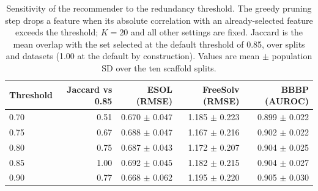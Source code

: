 \begin{table}[H]
\renewcommand{\thetable}{S20}
\centering
\small
\caption{Sensitivity of the recommender to the redundancy threshold. The greedy pruning step drops a feature when its absolute correlation with an already-selected feature exceeds the threshold; $K=20$ and all other settings are fixed. Jaccard is the mean overlap with the set selected at the default threshold of 0.85, over splits and datasets (1.00 at the default by construction). Values are mean $\pm$ population SD over the ten scaffold splits.}
\label{tab:redundancy}
\begin{tabular}{lrrrr}
\toprule
Threshold & Jaccard vs 0.85 & ESOL (RMSE) & FreeSolv (RMSE) & BBBP (AUROC) \\
\midrule
0.70 & 0.51 & 0.670 $\pm$ 0.047 & 1.185 $\pm$ 0.223 & 0.899 $\pm$ 0.022 \\
0.75 & 0.67 & 0.688 $\pm$ 0.047 & 1.167 $\pm$ 0.216 & 0.902 $\pm$ 0.022 \\
0.80 & 0.75 & 0.687 $\pm$ 0.043 & 1.172 $\pm$ 0.207 & 0.904 $\pm$ 0.025 \\
0.85 & 1.00 & 0.692 $\pm$ 0.045 & 1.182 $\pm$ 0.215 & 0.904 $\pm$ 0.027 \\
0.90 & 0.77 & 0.668 $\pm$ 0.062 & 1.195 $\pm$ 0.220 & 0.905 $\pm$ 0.030 \\
\bottomrule
\end{tabular}
\end{table}
